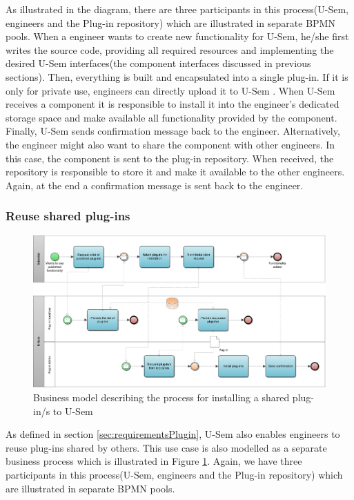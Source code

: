 As illustrated in the diagram, there are three participants in this process(U-Sem, engineers and the Plug-in repository) which are illustrated in separate BPMN pools. When a engineer wants to create new functionality for U-Sem, he/she first writes the source code, providing all required resources and implementing the desired U-Sem interfaces(the component interfaces discussed in previous sections). Then, everything is built and encapsulated into a single plug-in. If it is only for private use, engineers can directly upload it to U-Sem . When U-Sem receives a component it is responsible to install it into the engineer's dedicated storage space and make available all functionality provided by the component. Finally, U-Sem sends confirmation message back to the engineer. Alternatively, the engineer might also want to share the component with other engineers. In this case, the component is sent to the plug-in repository. When received, the repository is responsible to store it and make it available to the other engineers. Again, at the end a confirmation message is sent back to the engineer.

\subsubsection{Reuse shared plug-ins}

\begin{figure}[h!]
  \centering
  	\includegraphics[scale=0.7,angle=270]{plug-in/business_processes/InstallPlugInFromRepoBusinessModel.jpg}
  \caption{Business model describing the process for installing a shared plug-in/s to U-Sem}
  \label{fig_repo_bpm}
\end{figure}

As defined in section \ref{sec:requirementsPlugin}, U-Sem also enables engineers to reuse plug-ins shared by others. This use case is also modelled as a separate business process which is illustrated in Figure \ref{fig_repo_bpm}. Again, we have three participants in this process(U-Sem, engineers and the Plug-in repository) which are illustrated in separate BPMN pools. 

